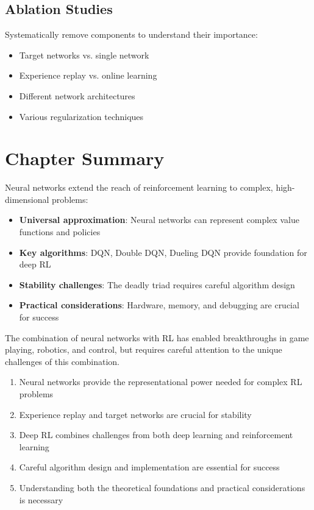 \subsection{Ablation Studies}

Systematically remove components to understand their importance:
\begin{itemize}
\item Target networks vs. single network
\item Experience replay vs. online learning
\item Different network architectures
\item Various regularization techniques
\end{itemize}

\section{Chapter Summary}

Neural networks extend the reach of reinforcement learning to complex, high-dimensional problems:

\begin{itemize}
\item \textbf{Universal approximation}: Neural networks can represent complex value functions and policies
\item \textbf{Key algorithms}: DQN, Double DQN, Dueling DQN provide foundation for deep RL
\item \textbf{Stability challenges}: The deadly triad requires careful algorithm design
\item \textbf{Practical considerations}: Hardware, memory, and debugging are crucial for success
\end{itemize}

The combination of neural networks with RL has enabled breakthroughs in game playing, robotics, and control, but requires careful attention to the unique challenges of this combination.

\begin{keyideabox}
\begin{enumerate}
\item Neural networks provide the representational power needed for complex RL problems
\item Experience replay and target networks are crucial for stability
\item Deep RL combines challenges from both deep learning and reinforcement learning
\item Careful algorithm design and implementation are essential for success
\item Understanding both the theoretical foundations and practical considerations is necessary
\end{enumerate}
\end{keyideabox}
